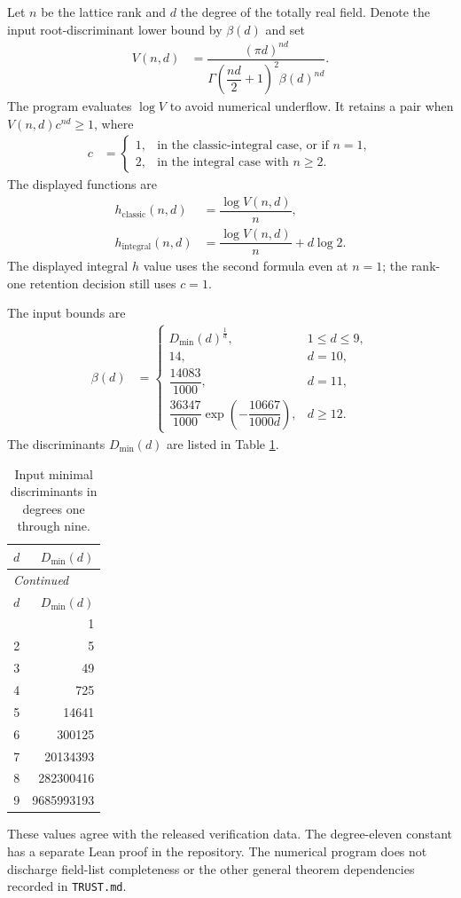 \documentclass[12pt]{amsart}
\theoremstyle{remark}
\theoremstyle{definition}
\numberwithin{equation}{section}
\begin{document}
Let $n$ be the lattice rank and $d$ the degree of the totally real field.
Denote the input root-discriminant lower bound by $\beta(d)$ and set
\begin{align*}
  V(n,d)&=\dfrac{(\pi d)^{nd}}
  {\Gamma\!\left(\dfrac{nd}{2}+1\right)^{2}\beta(d)^{nd}}.
\end{align*}
The program evaluates $\log V$ to avoid numerical underflow. It retains a
pair when $V(n,d)c^{nd}\geq 1$, where
\begin{align*}
  c&=
  \begin{cases}
    1,&\text{in the classic-integral case, or if }n=1,\\
    2,&\text{in the integral case with }n\geq 2.
  \end{cases}
\end{align*}
The displayed functions are
\begin{align*}
  h_{\mathrm{classic}}(n,d)&=\dfrac{\log V(n,d)}{n},\\
  h_{\mathrm{integral}}(n,d)&=\dfrac{\log V(n,d)}{n}+d\log 2.
\end{align*}
The displayed integral $h$ value uses the second formula even at $n=1$;
the rank-one retention decision still uses $c=1$.

The input bounds are
\begin{align*}
  \beta(d)&=
  \begin{cases}
    D_{\min}(d)^{\frac{1}{d}},&1\leq d\leq 9,\\
    14,&d=10,\\
    \dfrac{14083}{1000},&d=11,\\[6pt]
    \dfrac{36347}{1000}\exp\left(-\dfrac{10667}{1000d}\right),&d\geq 12.
  \end{cases}
\end{align*}
The discriminants $D_{\min}(d)$ are listed in Table \ref{tab:discriminants}.
\begingroup
\small
\begin{longtable}{rr}
\caption{Input minimal discriminants in degrees one through nine.}\label{tab:discriminants}\\
\toprule
$d$ & $D_{\min}(d)$ \\
\midrule
\endfirsthead
\multicolumn{2}{l}{\textit{Continued}}\\
\toprule
$d$ & $D_{\min}(d)$ \\
\midrule
\endhead
\midrule
\endfoot
\bottomrule
\endlastfoot
1 & 1 \\
2 & 5 \\
3 & 49 \\
4 & 725 \\
5 & 14641 \\
6 & 300125 \\
7 & 20134393 \\
8 & 282300416 \\
9 & 9685993193 \\
\end{longtable}
\endgroup
These values agree with the released verification data. The degree-eleven
constant has a separate Lean proof in the repository. The numerical program
does not discharge field-list completeness or the other general theorem
dependencies recorded in \texttt{TRUST.md}.
\end{document}

